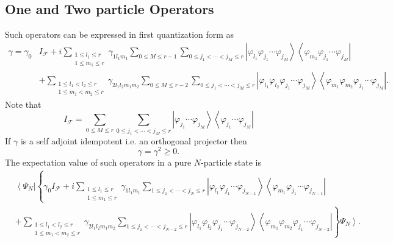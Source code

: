 \documentclass[aps,preprint]{revtex4}%
\begin{document}
\subsection{One and Two particle Operators}

Such operators can be expressed in first quantization form as
\begin{align}
\gamma=\gamma_{0}  &  I_{\mathcal{F}}+i\sum_{\substack{1\leq l_{1}\leq
r\\1\leq m_{1}\leq r}}\gamma_{1l_{1}m_{1}}\sum_{0\leq M\leq r-1}\sum_{0\leq
j_{1}<\cdots<j_{M}\leq r}\left\vert \varphi_{l_{1}}\varphi_{j_{1}}%
\cdots\varphi_{j_{M}}\right\rangle \left\langle \varphi_{m_{1}}\varphi_{j_{1}%
}\cdots\varphi_{j_{M}}\right\vert \nonumber\\
&  +\sum_{\substack{1\leq l_{1}<l_{2}\leq r\\1\leq m_{1}<m_{2}\leq r}%
}\gamma_{2l_{1}l_{2}m_{1}m_{2}}\sum_{0\leq M\leq r-2}\sum_{0\leq j_{1}%
<\cdots<j_{M}\leq r}\left\vert \varphi_{l_{1}}\varphi_{l_{2}}\varphi_{j_{1}%
}\cdots\varphi_{j_{M}}\right\rangle \left\langle \varphi_{m_{1}}\varphi
_{m_{2}}\varphi_{j_{1}}\cdots\varphi_{j_{M}}\right\vert .\nonumber
\end{align}
Note that
\begin{equation}
I_{\mathcal{F}}=\sum_{0\leq M\leq r}\sum_{0\leq j_{1}<\cdots<j_{M}\leq
r}\left\vert \varphi_{j_{1}}\cdots\varphi_{j_{M}}\right\rangle \left\langle
\varphi_{j_{1}}\cdots\varphi_{j_{M}}\right\vert
\end{equation}
If $\gamma$ is a self adjoint idempotent i.e. an orthogonal projector then
\begin{equation}
\gamma=\gamma^{2}\geq0.
\end{equation}
The expectation value of such operators in a pure $N$-particle state is
\begin{align}
&  \left\langle \Psi_{N}\right\vert \left\{  \gamma_{0}I_{\mathcal{F}}%
+i\sum_{\substack{1\leq l_{1}\leq r\\1\leq m_{1}\leq r}}\gamma_{1l_{1}m_{1}%
}\sum_{1\leq j_{1}<\cdots<j_{N}\leq r}\left\vert \varphi_{l_{1}}\varphi
_{j_{1}}\cdots\varphi_{j_{N-1}}\right\rangle \left\langle \varphi_{m_{1}%
}\varphi_{j_{1}}\cdots\varphi_{j_{N-1}}\right\vert \right. \\
&  \left.  +\sum_{\substack{1\leq l_{1}<l_{2}\leq r\\1\leq m_{1}<m_{2}\leq
r}}\gamma_{2l_{1}l_{2}m_{1}m_{2}}\sum_{1\leq j_{1}<\cdots<j_{N-2}\leq
r}\left\vert \varphi_{l_{1}}\varphi_{l_{2}}\varphi_{j_{1}}\cdots
\varphi_{j_{N-2}}\right\rangle \left\langle \varphi_{m_{1}}\varphi_{m_{2}%
}\varphi_{j_{1}}\cdots\varphi_{j_{N-2}}\right\vert \right\}  \left.  \Psi
_{N}\right\rangle .
\end{align}
\end{document}
